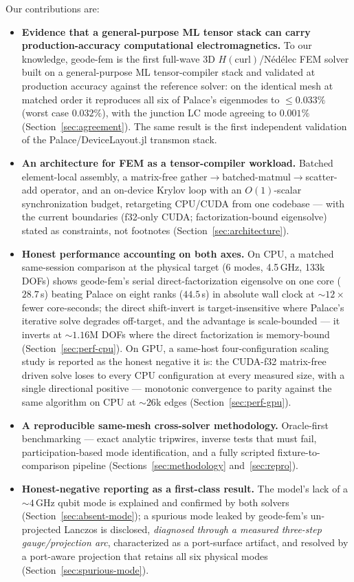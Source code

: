 \documentclass{anvil-paper}
\begin{document}
Our contributions are:
\begin{itemize}
  \item \textbf{Evidence that a general-purpose ML tensor stack can carry
    production-accuracy computational electromagnetics.} To our knowledge,
    geode-fem is the first full-wave 3D $H(\mathrm{curl})$/N\'ed\'elec FEM
    solver built on a general-purpose ML tensor-compiler stack and
    validated at production accuracy against the reference solver: on the
    identical mesh at matched order it reproduces all six of Palace's
    eigenmodes to $\leq 0.033\%$ (worst case $0.032\%$), with the junction
    LC mode agreeing to $0.001\%$ (Section~\ref{sec:agreement}). The same
    result is the first independent validation of the
    Palace/DeviceLayout.jl transmon stack.
  \item \textbf{An architecture for FEM as a tensor-compiler workload.}
    Batched element-local assembly, a matrix-free
    gather$\to$batched-matmul$\to$scatter-add operator, and an on-device
    Krylov loop with an $O(1)$-scalar synchronization budget, retargeting
    CPU/CUDA from one codebase --- with the current boundaries (f32-only
    CUDA; factorization-bound eigensolve) stated as constraints, not
    footnotes (Section~\ref{sec:architecture}).
  \item \textbf{Honest performance accounting on both axes.} On CPU, a
    matched same-session comparison at the physical target (6 modes,
    4.5\,GHz, 133k DOFs) shows geode-fem's serial direct-factorization
    eigensolve on one core ($28.7$\,s) beating Palace on eight ranks
    ($44.5$\,s) in absolute wall clock at ${\sim}12\times$ fewer
    core-seconds; the direct shift-invert is target-insensitive where
    Palace's iterative solve degrades off-target, and the advantage is
    scale-bounded --- it inverts at ${\sim}1.16$M DOFs where the direct
    factorization is memory-bound (Section~\ref{sec:perf-cpu}). On GPU, a
    same-host four-configuration
    scaling study is reported as the honest negative it is: the CUDA-f32
    matrix-free driven solve loses to every CPU configuration at every
    measured size, with a single directional positive --- monotonic
    convergence to parity against the same algorithm on CPU at ${\sim}26$k
    edges (Section~\ref{sec:perf-gpu}).
  \item \textbf{A reproducible same-mesh cross-solver methodology.}
    Oracle-first benchmarking --- exact analytic tripwires, inverse tests
    that must fail, participation-based mode identification, and a fully
    scripted fixture-to-comparison pipeline
    (Sections~\ref{sec:methodology} and~\ref{sec:repro}).
  \item \textbf{Honest-negative reporting as a first-class result.} The
    model's lack of a ${\sim}4$\,GHz qubit mode is explained and confirmed
    by both solvers (Section~\ref{sec:absent-mode}); a spurious mode
    leaked by geode-fem's un-projected Lanczos is disclosed,
    \emph{diagnosed through a measured three-step gauge/projection arc},
    characterized as a port-surface artifact, and resolved by a port-aware
    projection that retains all six physical modes
    (Section~\ref{sec:spurious-mode}).
\end{itemize}
\end{document}
